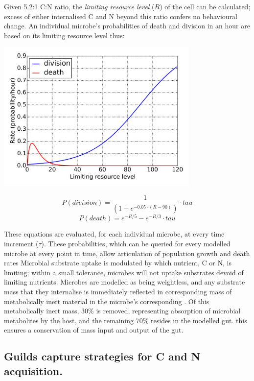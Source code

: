\documentclass{article}
\begin{document}
Given 5.2:1 C:N ratio, the \emph{limiting resource level} ($R$) of the cell can be calculated; excess of either internalised C and N beyond this ratio confers no behavioural change. 
An individual microbe's probabilities of death and division in an hour are based on its limiting resource level thus:
\begin{center}
  \includegraphics[width=10cm]{../probability-curves/death_growth_rates.png}
\end{center}
\begin{equation}
  P(division) = \frac{1}{(1 + e ^{ -0.05 \cdot (R - 90)})} \cdot tau
\end{equation}
\begin{equation}
  P(death) = e^{-R / 5} - e^{-R / 3} \cdot tau
\end{equation}

These equations are evaluated, for each individual microbe, at every time increment ($\tau$).
These probabilities, which can be queried for every modelled microbe at every point in time, allow articulation of population growth and death rates 
Microbial substrate uptake is modulated by which nutrient, C or N, is limiting; within a small tolerance, microbes will not uptake substrates devoid of limiting nutrients. 
Microbes are modelled as being weightless, and any substrate mass that they internalise is immediately reflected in corresponding mass of metabolically inert material in the microbe's corresponding \nutstore.
Of this metabolically inert mass, 30\% is removed, representing absorption of microbial metabolites by the host, and the remaining 70\% resides in the modelled gut. 
this ensures a conservation of mass input and output of the gut.


\subsection{Guilds capture strategies for C and N acquisition.}
\label{sec:guilds}
\end{document}
